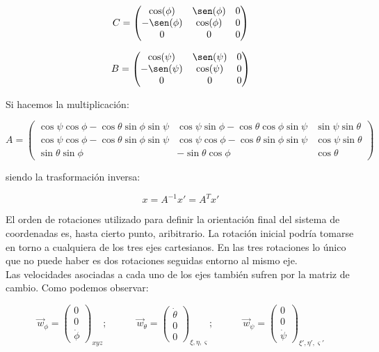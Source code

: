 \documentclass[12pt,a4paper]{book}
\newcommand{\tquad}{\quad \quad \quad}
\begin{document}
\begin{equation}
C = \begin{pmatrix}
\cos(\phi) &
\sen(\phi) &
0 \\ 
-\sen(\phi) &
\cos(\phi) &
0 \\ 
0 &
0 &
0 \\ 
\end{pmatrix}
\end{equation}

\begin{equation}
B = \begin{pmatrix}
\cos(\psi) &
\sen(\psi) &
0 \\ 
-\sen(\psi) &
\cos(\psi) &
0 \\ 
0 &
0 &
0 
\end{pmatrix}
\end{equation}


Si hacemos la multiplicación:

\begin{equation}
A = \begin{pmatrix}
\cos \psi \cos \phi -  \cos \theta \sin \phi \sin \psi & \cos \psi \sin \phi -  \cos \theta \cos \phi \sin \psi & \sin \psi \sin \theta \\
\cos \psi \cos \phi -  \cos \theta \sin \phi \sin \psi & \cos \psi \cos \phi -  \cos \theta \sin \phi \sin \psi & \cos \psi \sin \theta \\
\sin \theta \sin \phi & - \sin \theta \cos \phi & \cos \theta 
\end{pmatrix}
\end{equation}

siendo la trasformación inversa:

\begin{equation}
x = A^{-1} x' = A^T x'
\end{equation}

El orden de rotaciones utilizado para definir la orientación final del sistema de coordenadas es, hasta cierto punto, aribitrario. La rotación inicial podría tomarse en torno a cualquiera de los tres ejes cartesianos. En las tres rotaciones lo único que no puede haber es dos rotaciones seguidas entorno al mismo eje. \\

Las velocidades asociadas a cada uno de los ejes también sufren por la matriz de cambio. Como podemos observar:

\begin{equation}
\vec{w}_{\phi} = \begin{pmatrix}
0\\
0\\
\dot{\phi}
\end{pmatrix}_{xyz}; \tquad \vec{w}_\theta = \begin{pmatrix}
\dot{\theta} \\
0\\
0
\end{pmatrix}_{\xi,\eta,\varsigma}; \tquad \vec{w}_\psi = \begin{pmatrix}
0\\
0\\
\dot{\psi}
\end{pmatrix}_{\xi', \eta', \varsigma'}
\end{equation}
\end{document}
